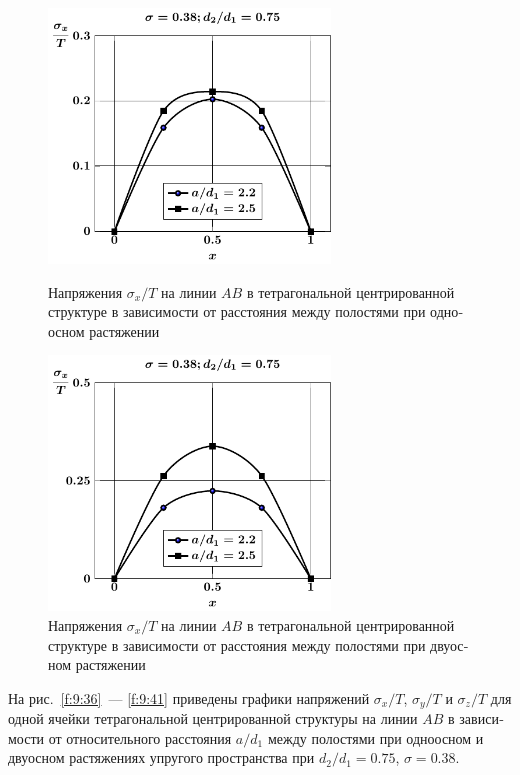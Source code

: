 \begin{russian}
\begin{figure}[h!]
\centering\footnotesize
\parbox[b]{7.5cm}{\centering\includegraphics[width=7.5cm]{cav9-a-d75-t1-sig_x.pdf}
\caption{Напряжения $\sigma_x/T$ на линии $AB$ в тетрагональной центрированной структуре в зависимости от расстояния между полостями при одноосном растяжении 
\label{f:9:36}}}\hfil\hfil
\parbox[b]{7.5cm}{\centering\includegraphics[width=7.5cm]{cav9-a-d75-t2-sig_x.pdf}
\caption{Напряжения $\sigma_x/T$ на линии $AB$ в тетрагональной центрированной структуре в зависимости от расстояния между полостями при двуосном растяжении
\label{f:9:37}}}
\end{figure}

На рис.~\ref{f:9:36}~--- \ref{f:9:41} приведены графики напряжений $\sigma_x/T$, $\sigma_y/T$ и $\sigma_z/T$ для одной ячейки тетрагональной центрированной структуры на линии $AB$ в зависимости от относительного расстояния $a/d_1$ между полостями при одноосном и двуосном растяжениях упругого пространства при $d_2/d_1=0.75$, $\sigma=0.38$.


\end{russian}
